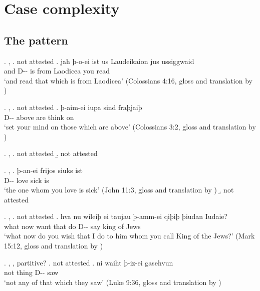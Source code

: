 
\chapter{Case complexity}

\section{The pattern}

\ex. , 
\a.  not attested
\bg. jah þ-o-ei ist us Laudeikaion jus ussiggwaid\\
 and D-- is\scsub{[nom]} from Laodicea you read\scsub{[acc]}\\
 `and read that which is from Laodicea' \hfill (Colossians 4:16, gloss and translation by \citealt[357]{harbert1978})

\ex. , 
\a.  not attested
\bg. þ-aim-ei iupa sind fraþjaiþ\\
 D-- above are\scsub{[nom]} {think on}\scsub{[dat]}\\
 `set your mind on those which are above' \hfill (Colossians 3:2, gloss and translation by \citealt[339]{harbert1978})

\ex. , 
\a.  not attested
\b.  not attested

\ex. , 
\ag. þ-an-ei frijos siuks ist\\
 D-- love\scsub{[acc]} sick is\scsub{[nom]}\\
 `the one whom you love is sick' \hfill (John 11:3, gloss and translation by \citealt[342]{harbert1978})
\b.  not attested

\ex. , 
\a.  not attested
\bg. hva nu wileiþ ei taujau þ-amm-ei qiþiþ þiudan Iudaie?\\
 what now want that do\scsub{[dat]} D-- say\scsub{[acc]} king {of Jews}\\
 `what now do you wish that I do to him whom you call King of the Jews?' \hfill (Mark 15:12, gloss and translation by \citealt[339]{harbert1978})

\ex. , , partitive?
\a.  not attested
\bg. ni waiht þ-iz-ei gasehvun\\
 not thing\scsub{[gen]} D-- saw\scsub{[acc]}\\
 `not any of that which they saw' \hfill (Luke 9:36, gloss and translation by \citealt[340]{harbert1978})

